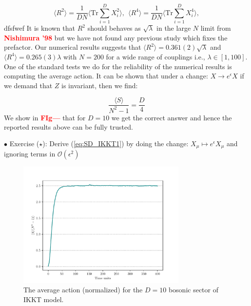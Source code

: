 \documentclass[11pt]{article}
\newcommand{\TODO}[1]{\textcolor{red}{{\bf #1}}}
\begin{document}
\begin{equation}
	\langle R^2 \rangle =   \frac{1}{DN} \Bigg \langle \mbox{Tr} \sum_{i=1}^{D} X_{i}^2 \bigg \rangle, 
	~~ \langle R^4 \rangle =   \frac{1}{DN} \Bigg \langle \mbox{Tr} \sum_{i=1}^{D} X_{i}^4 \bigg \rangle, 
\end{equation}
dfsfwef
It is known that $R^2$ should behaves as $\sqrt{\lambda}$ in the large $N$ limit 
from \TODO{Nishimura '98} but we have not found any previous study which fixes the prefactor. Our numerical results suggests that $ \langle R^2 \rangle = 0.361(2) \sqrt{\lambda}$ and $ \langle R^4 \rangle = 0.265(3) \lambda$ with $N = 200$ for a wide range of couplings i.e., 
$\lambda \in [1,100]$. 
One of the standard tests we do for the reliability of the numerical results is 
computing the average action. It can be shown that under a 
change: $X \to e^{\epsilon} X$ if we demand that $Z$ is invariant, 
then we find:

\begin{equation}
\label{eq:SD_IKKT1} 
	\frac{\langle S \rangle}{N^2 - 1} = \frac{D}{4} 
\end{equation}
We show in \TODO{FIg---} that for $D=10$ we get the correct answer and 
hence the reported results above can be fully trusted. 

\begin{mdframed}[backgroundcolor=blue!3] 
	\textsc{} 
	$\bullet$ Exercise (${\star}$): Derive (\ref{eq:SD_IKKT1}) by doing the change: $X_{\mu} \mapsto e^{\epsilon}X_{\mu}$ and ignoring terms in 
	$\mathcal{O}(\epsilon^{2})$
\end{mdframed}


\begin{figure}[htbp] 
	\centering 
	\includegraphics[width=0.75\textwidth]{figs/IKKT_plot_S.pdf}
	\caption{\label{fig:IKKT_2}The average action (normalized) for the $D=10$ bosonic sector of IKKT model.}
\end{figure}
\end{document}
